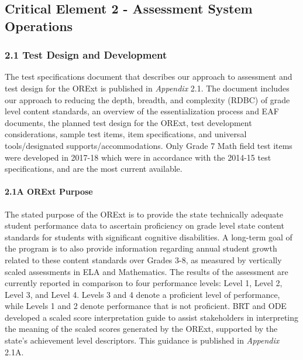 \documentclass[]{article}
\title{}
\author{}
\date{}
\let\oldparagraph\paragraph
\renewcommand{\paragraph}[1]{\oldparagraph{#1}\mbox{}}
\begin{document}
{
\setcounter{tocdepth}{5}
\tableofcontents
}
\hypertarget{critical-element-2---assessment-system-operations}{%
\subsection{Critical Element 2 - Assessment System
Operations}\label{critical-element-2---assessment-system-operations}}

\hypertarget{test-design-and-development}{%
\subsubsection{2.1 Test Design and
Development}\label{test-design-and-development}}

The test specifications document that describes our approach to
assessment and test design for the ORExt is published in \emph{Appendix}
2.1. The document includes our approach to reducing the depth, breadth,
and complexity (RDBC) of grade level content standards, an overview of
the essentialization process and EAF documents, the planned test design
for the ORExt, test development considerations, sample test items, item
specifications, and universal tools/designated supports/accommodations.
Only Grade 7 Math field test items were developed in 2017-18 which were
in accordance with the 2014-15 test specifications, and are the most
current available.

\hypertarget{a-orext-purpose}{%
\paragraph{2.1A ORExt Purpose}\label{a-orext-purpose}}

The stated purpose of the ORExt is to provide the state technically
adequate student performance data to ascertain proficiency on grade
level state content standards for students with significant cognitive
disabilities. A long-term goal of the program is to also provide
information regarding annual student growth related to these content
standards over Grades 3-8, as measured by vertically scaled assessments
in ELA and Mathematics. The results of the assessment are currently
reported in comparison to four performance levels: Level 1, Level 2,
Level 3, and Level 4. Levels 3 and 4 denote a proficient level of
performance, while Levels 1 and 2 denote performance that is not
proficient. BRT and ODE developed a scaled score interpretation guide to
assist stakeholders in interpreting the meaning of the scaled scores
generated by the ORExt, supported by the state's achievement level
descriptors. This guidance is published in \emph{Appendix} 2.1A.
\end{document}
